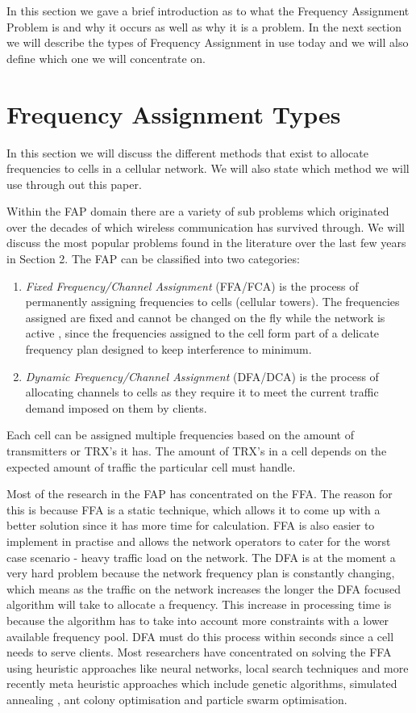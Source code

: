 In this section we gave a brief introduction as to what the Frequency Assignment Problem is and why it occurs as well as why it is a problem. In the next section we will describe the types of Frequency Assignment in use today and we will also define which one we will concentrate on.
\section{Frequency Assignment Types}
In this section we will discuss the different methods that exist to allocate frequencies to cells in a cellular network. We will also state which method we will use through out this paper.

Within the FAP domain there are  a variety of sub problems which originated over the decades of which wireless communication has survived through. We will discuss the most popular problems found in the literature over the last few years in Section 2. The FAP can be classified into two categories:
\begin{enumerate}[\bf{(}a\bf{)}]
\item \emph{Fixed Frequency/Channel Assignment} (FFA/FCA) is the process of permanently assigning frequencies to cells (cellular towers). The frequencies assigned are fixed and cannot be changed on the fly while the network is active , since the frequencies assigned to the cell form part of a delicate frequency plan designed to keep interference to minimum.
\item \emph{Dynamic Frequency/Channel Assignment} (DFA/DCA) is the process of allocating channels to cells as they require it to meet the current traffic demand imposed on them by clients. 
\end{enumerate}
Each cell can be assigned multiple frequencies based on the amount of transmitters or TRX's it has. The amount of TRX's in a cell depends on the expected amount of traffic the particular cell must 
handle.

Most of the research in the FAP has concentrated on the FFA. The reason for this is because FFA is a static technique, which allows it to come up with a better solution since it has more time for 
calculation. FFA is also easier to implement in practise and allows the network operators to cater for the worst case scenario - heavy traffic load on the network. The DFA is at the moment a very hard 
problem because the network frequency plan is constantly changing, which means as the traffic on the network increases the longer the DFA focused algorithm will take to allocate a frequency. This 
increase in processing time is because the algorithm has to take into account more constraints with a lower available frequency pool. DFA must do this process within seconds since a cell needs to serve clients. Most researchers have concentrated on solving the FFA using heuristic approaches like neural networks, local search techniques and more recently meta heuristic approaches which include genetic algorithms, simulated annealing , ant colony optimisation and particle swarm optimisation.

